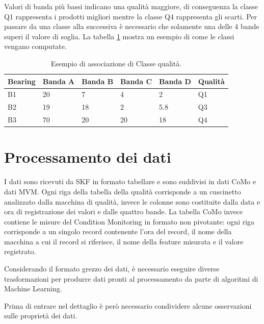 Valori di banda più bassi indicano una qualità maggiore, di conseguenza la classe Q1 rappresenta i prodotti migliori mentre la classe Q4 rappresenta gli scarti. 
Per passare da una classe alla successiva è necessario che solamente una delle 4 bande superi il valore di soglia. 
La tabella \ref{mvm-esempio} mostra un esempio di come le classi vengano computate.

\begin{table}
	\caption{\label{mvm-esempio}Esempio di associazione di Classe qualità.}
	\centering
	\begin{tabular}{|l|l|l|l|l|l|}
		\hline
		Bearing & \multicolumn{1}{c|}{Banda A} & \multicolumn{1}{c|}{Banda B} & \multicolumn{1}{c|}{Banda C} & \multicolumn{1}{c|}{Banda D} & Qualità \\ \hline
		B1      & 20                           & 7                            & 4                            & 2                            & Q1      \\ \hline
		B2      & 19                           & 18                           & 2                            & 5.8                          & Q3      \\ \hline
		B3      & 70                           & 20                           & 20                           & 18                           & Q4      \\ \hline
	\end{tabular}
\end{table}

\section{Processamento dei dati}
I dati sono ricevuti da SKF in formato tabellare e sono suddivisi in dati CoMo e dati MVM. Ogni riga della tabella della qualità corrisponde a un cuscinetto analizzato dalla macchina di qualità, invece le colonne sono costituite dalla data e ora di registrazione dei valori e dalle quattro bande.
La tabella CoMo invece contiene le misure del Condition Monitoring in formato non pivotante: ogni riga corrisponde a un singolo record contenente l'ora del record, il nome della macchina a cui il record si riferisce, il nome della feature misurata e il valore registrato.

Considerando il formato grezzo dei dati, è necessario eseguire diverse trasformazioni per produrre dati pronti al processamento da parte di algoritmi di Machine Learning. 

Prima di entrare nel dettaglio è però necessario condividere alcune osservazioni sulle proprietà dei dati.

